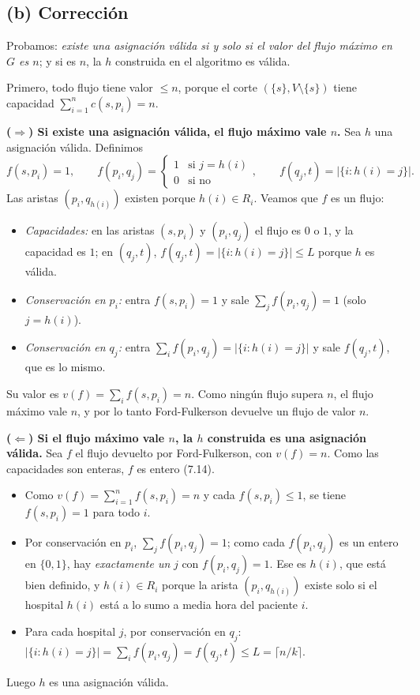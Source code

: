 \subsection*{(b) Corrección}

Probamos: \emph{existe una asignación válida si y solo si el valor del flujo máximo en $G$ es $n$}; y si es $n$, la $h$ construida en el algoritmo es válida.

Primero, todo flujo tiene valor $\le n$, porque el corte $(\{s\},V\setminus\{s\})$ tiene capacidad $\sum_{i=1}^n c(s,p_i)=n$.

\textbf{($\Rightarrow$) Si existe una asignación válida, el flujo máximo vale $n$.} Sea $h$ una asignación válida. Definimos
\[ f(s,p_i)=1,\qquad f(p_i,q_j)=\begin{cases}1 & \text{si } j=h(i)\\ 0 & \text{si no}\end{cases},\qquad f(q_j,t)=|\{i : h(i)=j\}|. \]
Las aristas $(p_i,q_{h(i)})$ existen porque $h(i)\in R_i$. Veamos que $f$ es un flujo:
\begin{itemize}
\item \emph{Capacidades:} en las aristas $(s,p_i)$ y $(p_i,q_j)$ el flujo es $0$ o $1$, y la capacidad es $1$; en $(q_j,t)$, $f(q_j,t)=|\{i:h(i)=j\}|\le L$ porque $h$ es válida.
\item \emph{Conservación en $p_i$:} entra $f(s,p_i)=1$ y sale $\sum_j f(p_i,q_j)=1$ (solo $j=h(i)$).
\item \emph{Conservación en $q_j$:} entra $\sum_i f(p_i,q_j)=|\{i:h(i)=j\}|$ y sale $f(q_j,t)$, que es lo mismo.
\end{itemize}
Su valor es $v(f)=\sum_i f(s,p_i)=n$. Como ningún flujo supera $n$, el flujo máximo vale $n$, y por lo tanto Ford-Fulkerson devuelve un flujo de valor $n$.

\textbf{($\Leftarrow$) Si el flujo máximo vale $n$, la $h$ construida es una asignación válida.} Sea $f$ el flujo devuelto por Ford-Fulkerson, con $v(f)=n$. Como las capacidades son enteras, $f$ es entero (7.14).
\begin{itemize}
\item Como $v(f)=\sum_{i=1}^n f(s,p_i)=n$ y cada $f(s,p_i)\le 1$, se tiene $f(s,p_i)=1$ para todo $i$.
\item Por conservación en $p_i$, $\sum_j f(p_i,q_j)=1$; como cada $f(p_i,q_j)$ es un entero en $\{0,1\}$, hay \emph{exactamente un} $j$ con $f(p_i,q_j)=1$. Ese es $h(i)$, que está bien definido, y $h(i)\in R_i$ porque la arista $(p_i,q_{h(i)})$ existe solo si el hospital $h(i)$ está a lo sumo a media hora del paciente $i$.
\item Para cada hospital $j$, por conservación en $q_j$: $|\{i:h(i)=j\}|=\sum_i f(p_i,q_j)=f(q_j,t)\le L=\lceil n/k\rceil$.
\end{itemize}
Luego $h$ es una asignación válida.

